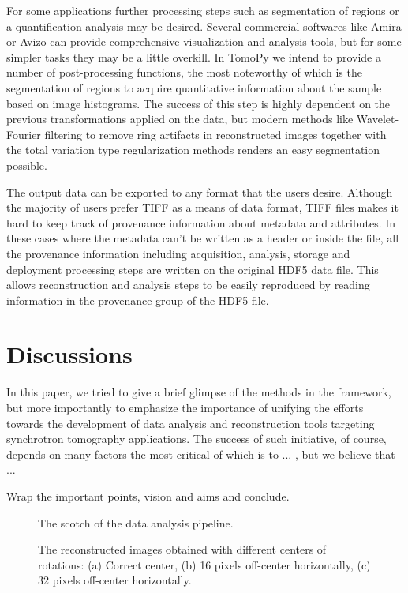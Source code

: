 \documentclass[pdf]{iucr}              %
\begin{document}
For some applications further processing steps such as segmentation of regions or a quantification analysis may be desired. Several commercial softwares like Amira or Avizo can provide comprehensive visualization and analysis tools, but for some simpler tasks they may be a little overkill. In TomoPy we intend to provide a number of post-processing functions, the most noteworthy of which is the segmentation of regions to acquire quantitative information about the sample based on image histograms. The success of this step is highly dependent on the previous transformations applied on the data, but modern methods like Wavelet-Fourier filtering to remove ring artifacts in reconstructed images together with the total variation type regularization methods renders an easy segmentation possible. 

The output data can be exported to any format that the users desire. Although the majority of users prefer TIFF as a means of data format, TIFF files makes it hard to keep track of provenance information about metadata and attributes. In these cases where the metadata can't be written as a header or inside the file, all the provenance information including acquisition, analysis, storage and deployment processing steps are written on the original HDF5 data file. This allows reconstruction and analysis steps to be easily reproduced by reading information in the provenance group of the HDF5 file. 

\section{Discussions}

In this paper, we tried to give a brief glimpse of the methods in the framework, but more importantly to emphasize the importance of unifying the efforts towards the development of data analysis and reconstruction tools targeting synchrotron tomography applications. The success of such initiative, of course, depends on many factors the most critical of which is to ... , but we believe that ...

Wrap the important points, vision and aims and conclude.


\onecolumn
\begin{figure}
\centering
\caption{The scotch of the data analysis pipeline.}
\label{fig:ProcessSegmentation}
\end{figure}
\twocolumn


\begin{figure}
\centering
\caption{The reconstructed images obtained with different centers of rotations: (a) Correct center, (b) 16 pixels  off-center horizontally, (c) 32 pixels off-center horizontally.}
\label{fig:OptimizeCenter1}
\end{figure}
\end{document}
